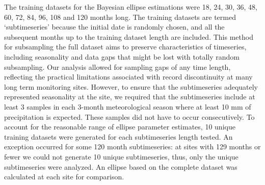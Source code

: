 \documentclass[draft, linenumbers]{agujournal2018}
\begin{document}
The training datasets for the Bayesian ellipse estimations were 18, 24, 30, 36, 48, 60, 72, 84, 96, 108 and 120 months long. The training datasets are termed `subtimeseries' because the initial date is randomly chosen, and all the subsequent months up to the training dataset length are included. This method for subsampling the full dataset aims to preserve characteristics of timeseries, including seasonality and data gaps that might be lost with totally random subsampling. Our analysis allowed for sampling gaps of any time length, reflecting the practical limitations associated with record discontinuity at many long term monitoring sites. However, to ensure that the subtimeseries adequately represented seasonality at the site, we required that the subtimeseries include at least 3 samples in each 3-month meteorological season where at least 10 mm of precipitation is expected. These samples did not have to occur consecutively. To account for the reasonable range of ellipse parameter estimates, 10 unique training datasets were generated for each subtimeseries length tested. An exception occurred for some 120 month subtimeseries: at sites with 129 months or fewer we could not generate 10 unique subtimeseries, thus, only the unique subtimeseries were analyzed. An ellipse based on the complete dataset was calculated at each site for comparison.
\end{document}
